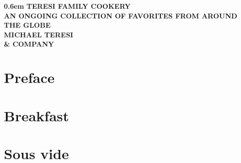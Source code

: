 \documentclass{family_cookbook}
\begin{document}
\frontmatter
\begin{titlepage}
\onecolumn
\pagestyle{empty}
\newcommand\nbvspace[1][3]{\vspace*{\stretch{#1}}}
\newcommand\nbstretchyspace{\spaceskip0.5em plus 0.25em minus 0.25em}
\newcommand{\nbtitlestretch}{\spaceskip0.6em}
{%
	\centering
	\bfseries
	\nbvspace[1]
	\Huge
	{\nbtitlestretch%
		TERESI FAMILY COOKERY
	}\\
	\nbvspace[1]
	\footnotesize
	AN ONGOING COLLECTION OF FAVORITES FROM AROUND THE GLOBE\\
	\nbvspace[1]
	\Large MICHAEL TERESI \\ \small \& COMPANY\\
	\nbvspace[1]
	\hspace{1em}  %
	\vfill
}
\end{titlepage}

\dominitoc%
\nomtcrule%


\tableofcontents


\chapter*{Preface}
\enlargethispage{5\baselineskip}  %


\clearpage


\mainmatter%


\setcounter{mtc}{0}  %
\mtcaddchapter%
\chapter{Breakfast}
\minitoc%
\clearpage







\chapter{Sous vide}
\minitoc%
\clearpage



\end{document}
